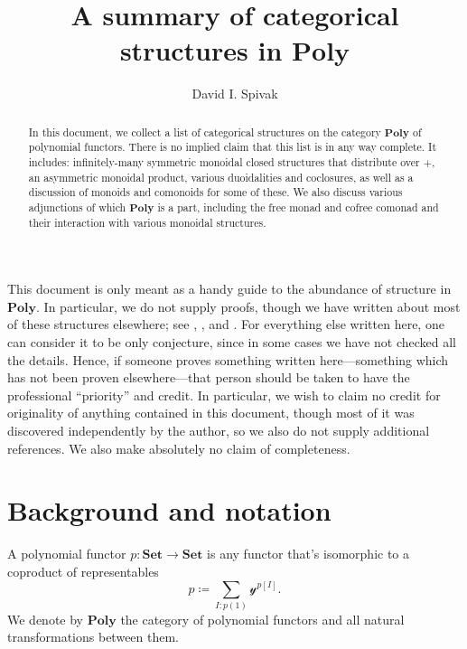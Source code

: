 \documentclass[11pt, one side, article]{memoir}
\theoremstyle{definition}
\theoremstyle{plain}
\newcommand{\Cat}[1]{\mathbf{#1}}%
\newcommand{\smset}{\Cat{Set}}
\newcommand{\yon}{{\mathcal{y}}}
\newcommand{\poly}{\Cat{Poly}}
\newcommand{\0}{\textsf{0}}
\newcommand{\1}{\tn{\textsf{1}}}
\begin{document}
\title{A summary of categorical structures in $\poly$}

\author{David I. Spivak}


\maketitle

\begin{abstract}
In this document, we collect a list of categorical structures on the category $\poly$ of polynomial functors. There is no implied claim that this list is in any way complete. It includes: infinitely-many symmetric monoidal closed structures that distribute over $+$, an asymmetric monoidal product, various duoidalities and coclosures, as well as a discussion of monoids and comonoids for some of these. We also discuss various adjunctions of which $\poly$ is a part, including the free monad and cofree comonad and their interaction with various monoidal structures. 
\end{abstract}


\tableofcontents*
\bigskip

This document is only meant as a handy guide to the abundance of structure in $\poly$. In particular, we do not supply proofs, though we have written about most of these structures elsewhere; see \cite{spivak2021functorial}, \cite{niu2022poly}, and \cite{spivak2022polynomial}. For everything else written here, one can consider it to be only conjecture, since in some cases we have not checked all the details. Hence, if someone proves something written here---something which has not been proven elsewhere---that person should be taken to have the professional ``priority'' and credit. In particular, we wish to claim no credit for originality of anything contained in this document, though most of it was discovered independently by the author, so we also do not supply additional references. We also make absolutely no claim of completeness.

\chapter{Background and notation}

A polynomial functor $p\colon\smset\to\smset$ is any functor that's isomorphic to a coproduct of representables
\[
p\coloneqq\sum_{I: p(1)}\yon^{p[I]}.
\]
We denote by $\poly$ the category of polynomial functors and all natural transformations between them.
\end{document}
